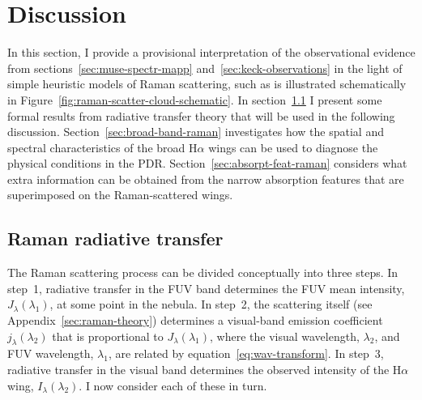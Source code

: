 \documentclass[useAMS, usenatbib, a4paper]{mnras}
\newcommand\ha{\ensuremath{\text{H}\alpha}}
\begin{document}
\section{Discussion}
\label{sec:discussion}

In this section, I provide a provisional interpretation
of the observational evidence
from sections~\ref{sec:muse-spectr-mapp} and~\ref{sec:keck-observations}
in the light of simple heuristic models of Raman scattering,
such as is illustrated schematically in Figure~\ref{fig:raman-scatter-cloud-schematic}.
In section~\ref{sec:raman-radi-transf} I present some formal results
from radiative transfer theory that will be used in the following discussion.
Section~\ref{sec:broad-band-raman} investigates
how the spatial and spectral
characteristics of the broad \ha{} wings can be used to diagnose
the physical conditions in the PDR.\@
Section~\ref{sec:absorpt-feat-raman} considers 
what extra information
can be obtained from the narrow absorption features that are superimposed on the
Raman-scattered wings.

\subsection{Raman radiative transfer}
\label{sec:raman-radi-transf}

The Raman scattering process can be divided conceptually into three steps.
In step~1, radiative transfer in the FUV band determines the FUV mean intensity,
\(J_\lambda(\lambda_1)\), at some point in the nebula.
In step~2, the scattering itself (see Appendix~\ref{sec:raman-theory})
determines a visual-band emission coefficient \(j_\lambda(\lambda_2)\)
that is proportional to \(J_\lambda(\lambda_1)\), where the
visual wavelength, \(\lambda_2\),
and FUV wavelength, \(\lambda_1\),
are related by equation~\eqref{eq:wav-transform}.
In step~3, radiative transfer in the visual band determines the
observed intensity of the \ha{} wing, \(I_\lambda (\lambda_2)\).
I now consider each of these in turn. 
\end{document}
